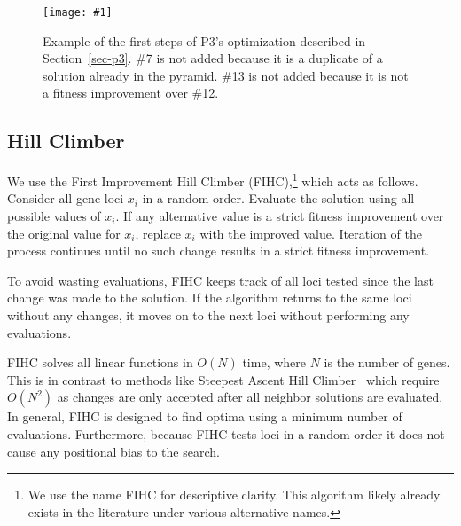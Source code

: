 \documentclass{sig-alternate}
\newcommand{\includegraphicsfit}[1]
{\texttt{[image: \#1]}}
\begin{document}
\begin{figure}
  \centering
  \includegraphicsfit{P3_big_fail}
  \caption{Example of the first steps of P3's optimization described in Section~\ref{sec-p3}.
  \#7 is not added because it is a duplicate of a solution already in the pyramid.  \#13 is
  not added because it is not a fitness improvement over \#12.}
  \label{fig-p3}
\end{figure}

\subsection{Hill Climber}
\label{sec-hillclimber}

We use the First Improvement Hill Climber
(FIHC),\footnote{We use the name FIHC for descriptive clarity.  This algorithm
  likely already exists in the literature under various alternative names.} which acts as follows.
Consider all gene loci
$x_i$ in a random order.  Evaluate the solution using all possible
values of $x_i$. If any alternative value is a strict fitness improvement
over the original value for $x_i$, replace $x_i$ with the improved
value.  Iteration of the process continues until no such change results in
a strict fitness improvement.

To avoid wasting evaluations, FIHC keeps track of all loci tested since the last
change was made to the solution.  If the algorithm returns to the same loci without
any changes, it moves on to the next loci without performing any evaluations.

FIHC solves all linear functions in $O(N)$ time, where $N$ is the number of
genes.  This is in contrast to
methods like Steepest Ascent Hill Climber~\cite{bosman:2011:lsbbo, goldman:2012:ltga}
which require $O(N^2)$ as changes are only accepted after all neighbor solutions
are evaluated.  In general, FIHC is designed to find optima using a minimum number
of evaluations.  Furthermore, because FIHC tests loci in a random order it does
not cause any positional bias to the search.
\end{document}
